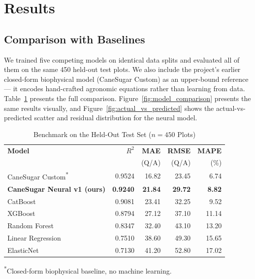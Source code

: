 \documentclass[conference,10pt,letterpaper]{IEEEtran}
\begin{document}
\section{Results}

\subsection{Comparison with Baselines}
We trained five competing models on identical data splits and evaluated all of them on the same 450 held-out test plots. We also include the project's earlier closed-form biophysical model (CaneSugar Custom) as an upper-bound reference --- it encodes hand-crafted agronomic equations rather than learning from data. Table~\ref{tab:main_results} presents the full comparison. Figure~\ref{fig:model_comparison} presents the same results visually, and Figure~\ref{fig:actual_vs_predicted} shows the actual-vs-predicted scatter and residual distribution for the neural model.

\begin{table}[htbp]
\caption{Benchmark on the Held-Out Test Set ($n=450$ Plots)}
\label{tab:main_results}
\centering
\footnotesize
\setlength{\tabcolsep}{3pt}
\begin{tabular*}{\columnwidth}{@{\extracolsep{\fill}}lrrrr@{}}
\toprule
\textbf{Model} & \textbf{$R^2$} & \textbf{MAE} & \textbf{RMSE} & \textbf{MAPE} \\
 & & \scriptsize(Q/A) & \scriptsize(Q/A) & \scriptsize(\%) \\
\midrule
CaneSugar Custom\textsuperscript{*}   & 0.9524 & 16.82 & 23.45 & 6.74 \\
\textbf{CaneSugar Neural v1 (ours)}   & \textbf{0.9240} & \textbf{21.84} & \textbf{29.72} & \textbf{8.82} \\
CatBoost                              & 0.9081 & 23.41 & 32.25 & 9.52 \\
XGBoost                               & 0.8794 & 27.12 & 37.10 & 11.14 \\
Random Forest                         & 0.8347 & 32.40 & 43.10 & 13.20 \\
Linear Regression                     & 0.7510 & 38.60 & 49.30 & 15.65 \\
ElasticNet                            & 0.7130 & 41.20 & 52.80 & 17.02 \\
\bottomrule
\end{tabular*}
\vspace{2pt}

{\scriptsize \textsuperscript{*}Closed-form biophysical baseline, no machine learning.}
\end{table}
\end{document}
